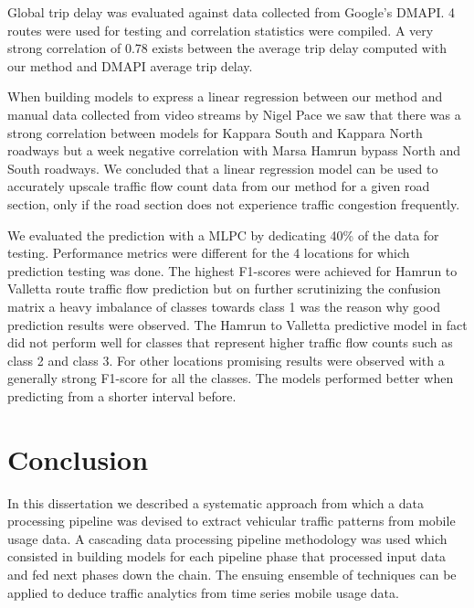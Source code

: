 \documentclass[12pt, a4paper]{report}
\theoremstyle{definition}
\theoremstyle{definition}%
\theoremstyle{definition}%
\theoremstyle{definition}%
\theoremstyle{definition}%
\theoremstyle{definition}%
\begin{document}
Global trip delay was evaluated against data collected from Google's DMAPI. 4 routes were used for testing and correlation statistics were compiled. A very strong correlation of 0.78 exists between the average trip delay computed with our method and DMAPI average trip delay. 

When building models to express a linear regression between our method and manual data collected from video streams by Nigel Pace we saw that there was a strong correlation between models for Kappara South and Kappara North roadways but a week negative correlation with Marsa Hamrun bypass North and South roadways. We concluded that a linear regression model can be used to accurately upscale traffic flow count data from our method for a given road section, only if the road section does not experience traffic congestion frequently.

We evaluated the prediction with a MLPC by dedicating 40\% of the data for testing. Performance metrics were different for the 4 locations for which prediction testing was done. The highest F1-scores were achieved for Hamrun to Valletta route traffic flow prediction but on further scrutinizing the confusion matrix a heavy imbalance of classes towards class 1 was the reason why good prediction results were observed. The Hamrun to Valletta predictive model in fact did not perform well for classes that represent higher traffic flow counts such as class 2 and class 3. For other locations promising results were observed with a generally strong F1-score for all the classes. The models performed better when predicting from a shorter interval before. 



\chapter{Conclusion} \label{chapter:conclusion}

In this dissertation we described a systematic approach from which a data processing pipeline was devised to extract vehicular traffic patterns from mobile usage data. A cascading data processing pipeline methodology was used which consisted in building models for each pipeline phase that processed input data and fed next phases down the chain. The ensuing ensemble of techniques can be applied to deduce traffic analytics from time series mobile usage data. 
\end{document}

